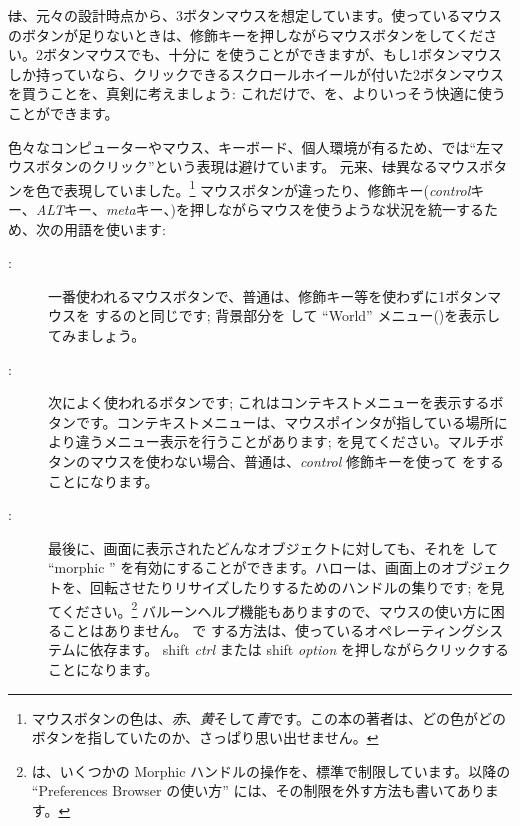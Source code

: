\documentclass[a4paper,10pt,twoside]{book}
\begin{document}
\st は、元々の設計時点から、3ボタンマウスを想定しています。使っているマウスのボタンが足りないときは、修飾キーを押しながらマウスボタンを\click してください。2ボタンマウスでも、十分に \pharo を使うことができますが、もし1ボタンマウスしか持っていなら、クリックできるスクロールホイールが付いた2ボタンマウスを買うことを、真剣に考えましょう: これだけで、\pharo を、よりいっそう快適に使うことができます。

色々なコンピューターやマウス、キーボード、個人環境が有るため、\pharo では``左マウスボタンのクリック''という表現は避けています。
元来、\st は異なるマウスボタンを色で表現していました。\footnote{マウスボタンの色は、\emph{赤}、\emph{黄}そして\emph{青}です。この本の著者は、どの色がどのボタンを指していたのか、さっぱり思い出せません。}
マウスボタンが違ったり、修飾キー(\emph{control}キー、\emph{ALT}キー、\emph{meta}キー、\etc)を押しながらマウスを使うような状況を統一するため、次の用語を使います:
\begin{description}
\item [\click:] 一番使われるマウスボタンで、普通は、修飾キー等を使わずに1ボタンマウスを \click するのと同じです; 背景部分を \click して ``World'' メニュー()を表示してみましょう。
\item [\actclick:] 次によく使われるボタンです; これはコンテキストメニューを表示するボタンです。コンテキストメニューは、マウスポインタが指している場所により違うメニュー表示を行うことがあります; を見てください。マルチボタンのマウスを使わない場合、普通は、\emph{control} 修飾キーを使って \actclick をすることになります。
\item [\metaclick:] 最後に、画面に表示されたどんなオブジェクトに対しても、それを \metaclick して ``morphic '' を有効にすることができます。ハローは、画面上のオブジェクトを、回転させたりリサイズしたりするためのハンドルの集りです;  を見てください。\footnote{\pharo は、いくつかの Morphic ハンドルの操作を、標準で制限しています。以降の ``Preferences Browser の使い方'' には、その制限を外す方法も書いてあります。}
バルーンヘルプ機能もありますので、マウスの使い方に困ることはありません。
\pharo で \metaclick する方法は、使っているオペレーティングシステムに依存ます。
{\sc shift} \emph{ctrl} または {\sc shift} \emph{option} を押しながらクリックすることになります。
\end{description}
\end{document}
